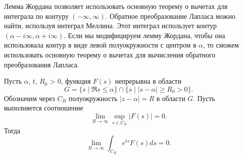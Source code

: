 \documentclass[../paper.tex]{subfile}
\begin{document}
Лемма Жордана позволяет использовать основную теорему о вычетах для интеграла по контуру $(-\infty, \infty)$.
Обратное преобразование Лапласа можно найти, используя интеграл Меллина. Этот интеграл использует контур $(\alpha - i\infty, \alpha + i\infty)$.
Если мы модифицируем лемму Жордана, чтобы она использовала контур в виде левой полуокружности с центром в $\alpha$, то сможем использовать основную теорему о вычетах для вычисления обратного преобразования Лапласа.
%
\begin{Lem}\label{modified-jordan}
Пусть $\alpha$, $t$, $R_0$ > 0, 
функция $F(s)$ непрерывна в области 
\[
	G = \{s \mid \Re s \le  \alpha \} \cap \{ s \mid |s-\alpha| \ge  R_0 > 0 \}
.\]
Обозначим через $C_R$ полуокружность $|z-\alpha| = R$ в области $G$.
Пусть выполняется соотношение
\[
	\lim\limits_{R \to \infty} \sup\limits_{s \in C_R} |F(s)| = 0
.\]
Тогда
\[
	\lim_{R \to \infty} \int_{C_R} e^{ts} F(s)ds = 0
.\]
\end{Lem}
\end{document}
